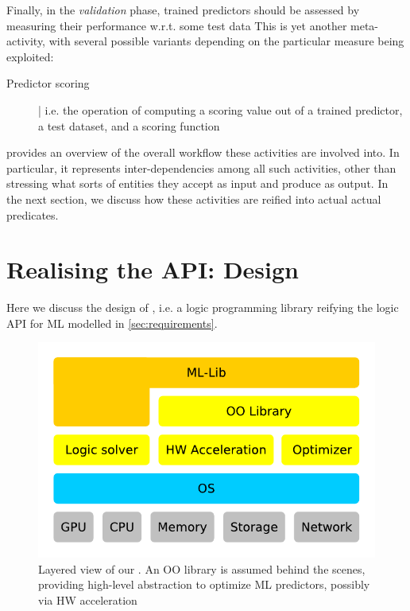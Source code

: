 \documentclass[12pt,a4paper,openright,twoside]{book}
\begin{document}
Finally, in the \emph{validation} phase, trained predictors should be assessed by measuring their performance w.r.t. some test data
%
This is yet another meta-activity, with several possible variants depending on the particular measure being exploited:
%
\begin{description}
    \item[Predictor scoring] | i.e. the operation of computing a scoring value out of a trained predictor, a test dataset, and a scoring function
\end{description}

%
 provides an overview of the overall workflow these activities are involved into.
%
In particular, it represents inter-dependencies among all such activities, other than stressing what sorts of entities they accept as input and produce as output.
%
In the next section, we discuss how these activities are reified into actual actual predicates.

\section{Realising the API: \mllib{} Design}
\label{sec:project}

Here we discuss the design of \mllib, i.e. a logic programming library reifying the logic API for ML modelled in \cref{sec:requirements}.

\begin{figure}
    \centering
    \includegraphics[width=.5\linewidth]{figures/mllib-layers.pdf}
    \caption{Layered view of our \mllib{}. An OO library is assumed behind the scenes, providing high-level abstraction to optimize ML predictors, possibly via HW acceleration}
    \label{fig:mllib-layers}
\end{figure}
\end{document}
